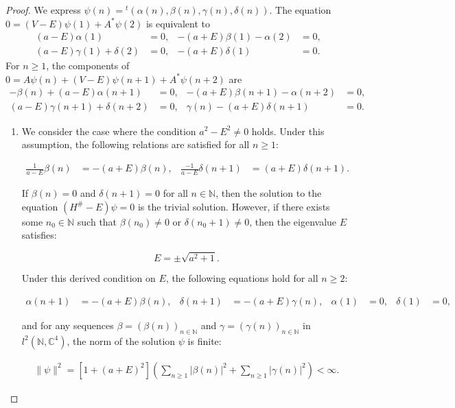 \documentclass{amsart}
\theoremstyle{definition}
\theoremstyle{remark}
\begin{document}
\begin{proof}
We express $\psi(n)={}^t\! (\alpha(n),\beta(n),\gamma(n),\delta(n)).$ The equation $0=(V-E)\psi(1)+A^*\psi(2)$ is equivalent to
\begin{align*}
(a-E)\alpha(1)&=0,&-(a+E)\beta(1)-\alpha(2)&=0,\\
(a-E)\gamma(1)+\delta(2)&=0,&-(a+E)\delta(1)&=0.
\end{align*}
For $n\geq 1$, the components of $0=A\psi(n)+(V-E)\psi(n+1)+A^*\psi(n+2)$ are 
\begin{align*}
-\beta(n)+(a-E)\alpha(n+1)&=0,&-(a+E)\beta(n+1)-\alpha(n+2)&=0,\\
(a-E)\gamma(n+1)+\delta(n+2)&=0,&\gamma(n)-(a+E)\delta(n+1)&=0.
\end{align*}

\begin{enumerate}
\item We consider the case where the condition \(a^2 - E^2 \neq 0\) holds. Under this assumption, the following relations are satisfied for all \(n \geq 1\):

\begin{align*}
\frac{1}{a - E} \beta(n) &= -(a + E) \beta(n), &
\frac{-1}{a - E} \delta(n + 1) &= (a + E) \delta(n + 1).
\end{align*}

If \(\beta(n) = 0\) and \(\delta(n + 1) = 0\) for all \(n \in \mathbb{N}\), then the solution to the equation $(H^{\#}-E)\psi=0$ is the trivial solution. However, if there exists some \(n_0 \in \mathbb{N}\) such that \(\beta(n_0) \neq 0\) or \(\delta(n_0 + 1) \neq 0\), then the eigenvalue \(E\) satisfies:

\[ E = \pm \sqrt{a^2 + 1}. \]

Under this derived condition on \(E\), the following equations hold for all \(n \geq 2\):

\begin{align*}
\alpha(n + 1) &= -(a + E) \beta(n), &
\delta(n + 1) &= -(a + E) \gamma(n), &
\alpha(1) &= 0, &
\delta(1) &= 0,
\end{align*}

and for any sequences \(\beta = (\beta(n))_{n \in \mathbb{N}}\) and \(\gamma = (\gamma(n))_{n \in \mathbb{N}}\) in \(l^2(\mathbb{N}, \mathbb{C}^4)\), the norm of the solution \(\psi\) is finite:

\begin{align*}
\lVert \psi \rVert^2 = [1 + (a + E)^2] \left( \sum_{n \geq 1} |\beta(n)|^2 + \sum_{n \geq 1} |\gamma(n)|^2 \right) < \infty.
\end{align*}


\end{enumerate}
\end{proof}
\end{document}
